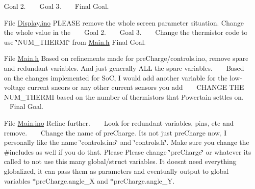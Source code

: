 \begin{DoxyRefList}
 Goal 2. ~\newline
 ~\newline
 Goal 3. ~\newline
 ~\newline
 Final Goal.  
\item[File \mbox{\hyperlink{_display_8ino}{Display.ino}} ]\label{todo__todo000006}%
%
 PLEASE remove the whole screen parameter situation. Change the whole value in the ~\newline
 ~\newline
 Goal 2. ~\newline
 ~\newline
 Goal 3. ~\newline
 ~\newline
 Change the thermistor code to use \char`\"{}\+NUM\+\_\+\+THERMI\char`\"{} from \mbox{\hyperlink{_main_8h}{Main.\+h}} Final Goal.  
\item[File \mbox{\hyperlink{_main_8h}{Main.h}} ]\label{todo__todo000007}%
%
 Based on refinements made for pre\+Charge/controls.\+ino, remove spare and redundant variables. And just generally ALL the spare variables. ~\newline
 ~\newline
 Based on the changes implemented for SoC, I would add another variable for the low-\/voltage current sneors or any other current sensors you add ~\newline
 ~\newline
 CHANGE THE NUM\+\_\+\+THERMI based on the number of thermistors that Powertain settles on. ~\newline
 ~\newline
 Final Goal.  
\item[File \mbox{\hyperlink{_main_8ino}{Main.ino}} ]\label{todo__todo000008}%
%
 Refine further. ~\newline
 ~\newline
 Look for redundant variables, pins, etc and remove. ~\newline
 ~\newline
 Change the name of pre\+Charge. It\textquotesingle{}s not just pre\+Charge now, I personally like the name \char`\"{}controls.\+ino\char`\"{} and \char`\"{}controls.\+h\char`\"{}. Make sure you change the \#includes as well if you do that. Please Please change \char`\"{}pre\+Charge\char`\"{} or whatever it\textquotesingle{}s called to not use this many global/struct variables. It doesn\textquotesingle{}t need everything globalized, it can pass them as parameters and eventually output to global variables $\ast$pre\+Charge.angle\+\_\+X and $\ast$pre\+Charge.angle\+\_\+Y. ~\newline

\end{DoxyRefList}
